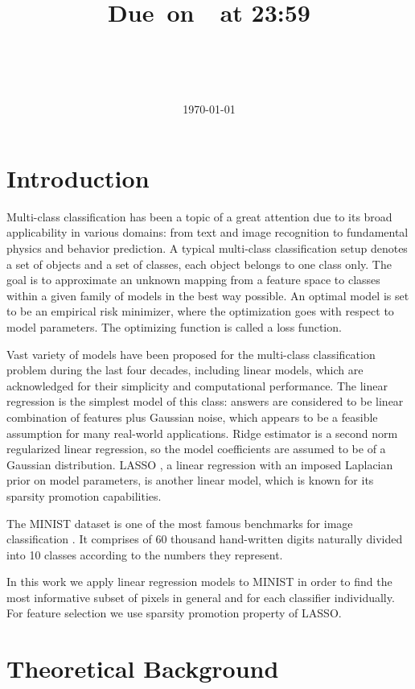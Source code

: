 \documentclass{article}
\title{
    \vspace{2in}
    \textmd{\textbf{\hmwkClass\\\ \hmwkTitle}}\\
    \normalsize\vspace{0.1in}\small{Due\ on\ \hmwkDueDate\ at 23:59}\\
    \vspace{0.1in}\large{\textit{\hmwkClassInstructor}}
    \vspace{1in}\\
    \justify{\textbf{Abstract: }\hmwkAbstract}
    \vspace{1in}
}
\author{\hmwkAuthorName\\ \hmwkAuthorEmail}
\date{\today}
\begin{document}
\maketitle
\newpage

\section{Introduction}
Multi-class classification has been a topic of a great attention due to its broad applicability in various domains: from text and image recognition to fundamental physics and behavior prediction. A typical multi-class classification setup denotes a set of objects and a set of classes, each object belongs to one class only. The goal is to approximate an unknown mapping from a feature space to classes within a given family of models in the best way possible. An optimal model is set to be an empirical risk minimizer, where the optimization goes with respect to model parameters. The optimizing function is called a loss function. 

Vast variety of models have been proposed for the multi-class classification problem during the last four decades, including linear models, which are acknowledged for their simplicity and computational performance. The linear regression is the simplest model of this class: answers are considered to be linear combination of features plus Gaussian noise, which appears to be a feasible assumption for many real-world applications. Ridge estimator \cite{ridge} is a second norm regularized linear regression, so the model coefficients are assumed to be of a Gaussian distribution.  LASSO \cite{lasso}, a linear regression with an imposed Laplacian prior on model parameters, is another linear model, which is known for its sparsity promotion capabilities. 

The MINIST dataset is one of the most famous benchmarks for image classification \cite{mnist}. It comprises of 60 thousand hand-written digits naturally divided into 10 classes according to the numbers they represent. 

In this work we apply linear regression models to MINIST in order to find the most informative subset of pixels in general and for each classifier individually. For feature selection we use sparsity promotion property of LASSO.

\section{Theoretical Background}
\end{document}
